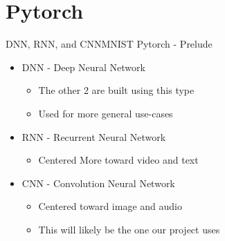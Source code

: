 \documentclass{beamer}
\begin{document}
\section{Pytorch}
\begin{frame}{DNN, RNN, and CNN}{MNIST Pytorch - Prelude}
\begin{itemize}
    \item DNN - Deep Neural Network 
    \begin{itemize}
        \item The other 2 are built using this type
        \item Used for more general use-cases
    \end{itemize}
        
    \item RNN - Recurrent Neural Network 
    \begin{itemize}
        \item Centered More toward video and text
    \end{itemize}
        
    \item CNN - Convolution Neural Network 
    \begin{itemize}
        \item Centered toward image and audio
        \item This will likely be the one our project uses
    \end{itemize}
\end{itemize}
\end{frame}
\end{document}
